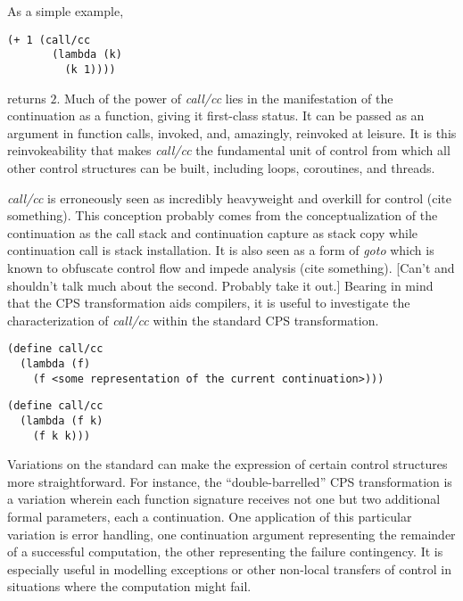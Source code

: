 \documentclass[ms]{byuprop}
\newcounter{example}
\begin{document}
As a simple example,

\begin{verbatim}
(+ 1 (call/cc
       (lambda (k)
         (k 1))))
\end{verbatim}

returns $2$. Much of the power of \emph{call/cc} lies in the manifestation of the 
continuation as a function, giving it first-class status. It can be passed as an 
argument in function calls, invoked, and, amazingly, reinvoked at leisure. It is 
this reinvokeability that makes \emph{call/cc} the fundamental unit of control 
from which all other control structures can be built, including loops, coroutines, 
and threads.

\emph{call/cc} is erroneously seen as incredibly heavyweight and overkill for 
control (cite something). This conception probably comes from the conceptualization 
of the continuation as the call stack and continuation capture as stack copy while 
continuation call is stack installation. It is also seen as a form of \emph{goto} 
which is known to obfuscate control flow and impede analysis (cite something). 
[Can't and shouldn't talk much about the second. Probably take it out.] Bearing in 
mind that the CPS transformation aids compilers, it is useful to investigate the 
characterization of \emph{call/cc} within the standard CPS transformation.

\begin{verbatim}
(define call/cc
  (lambda (f)
    (f <some representation of the current continuation>)))
\end{verbatim}

\begin{verbatim}
(define call/cc
  (lambda (f k)
    (f k k)))
\end{verbatim}

Variations on the standard can make the expression of certain control structures more 
straightforward. For instance, the ``double-barrelled'' CPS transformation is a 
variation wherein each function signature receives not one but two additional formal 
parameters, each a continuation. One application of this particular variation is 
error handling, one continuation argument representing the remainder of a successful 
computation, the other representing the failure contingency. It is especially useful 
in modelling exceptions or other non-local transfers of control in situations where 
the computation might fail.


\end{document}
